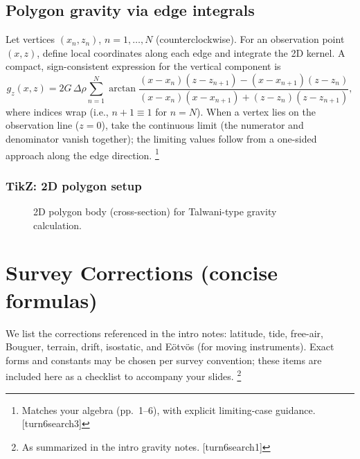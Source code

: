 \documentclass[11pt,a4paper]{article}
\begin{document}
\subsection{Polygon gravity via edge integrals}
Let vertices $(x_n,z_n)$, $n=1,\dots,N$ (counterclockwise). For an observation point $(x,z)$, define local coordinates along each edge and integrate the 2D kernel. A compact, sign-consistent expression for the vertical component is
\begin{equation}
  g_z(x,z) = 2G\,\Delta\rho\sum_{n=1}^{N} \arctan\!\frac{(x-x_n)(z-z_{n+1})-(x-x_{n+1})(z-z_n)}{(x-x_n)(x-x_{n+1})+(z-z_n)(z-z_{n+1})},
\end{equation}
where indices wrap (i.e., $n+1\equiv 1$ for $n=N$). When a vertex lies on the observation line ($z=0$), take the continuous limit (the numerator and denominator vanish together); the limiting values follow from a one-sided approach along the edge direction.
\footnote{Matches your algebra (pp.~1--6), with explicit limiting-case guidance. [turn6search3]}

\subsubsection*{TikZ: 2D polygon setup}
\begin{figure}[h]
  \centering
  \caption{2D polygon body (cross-section) for Talwani-type gravity calculation.}
\end{figure}

\section{Survey Corrections (concise formulas)}
We list the corrections referenced in the intro notes: latitude, tide, free-air, Bouguer, terrain, drift, isostatic, and E\"otv\"os (for moving instruments). Exact forms and constants may be chosen per survey convention; these items are included here as a checklist to accompany your slides.
\footnote{As summarized in the intro gravity notes. [turn6search1]}
\end{document}
